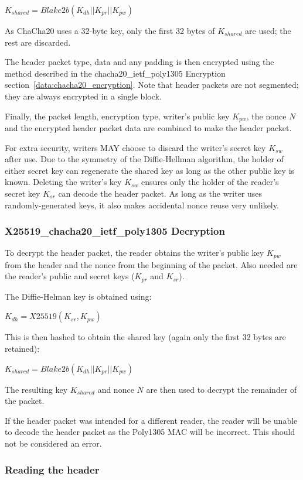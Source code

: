\documentclass[10pt]{article}
\begin{document}
$K_{shared} = Blake2b(K_{dh} || K_{pr} || K_{pw})$

As ChaCha20 uses a 32-byte key, only the first 32 bytes of $K_{shared}$ are used; the rest are discarded.

The header packet type, data and any padding is then encrypted using the method described in the
chacha20\_ietf\_poly1305 Encryption section~\ref{data:chacha20_encryption}.
Note that header packets are not segmented; they are always encrypted in a single block.

Finally, the packet length, encryption type, writer's public key $K_{pw}$,
the nonce $N$ and the encrypted header packet data are combined to make the header packet.

For extra security, writers MAY choose to discard the writer's secret key $K_{sw}$ after use.
Due to the symmetry of the Diffie-Hellman algorithm, the holder of either secret key can regenerate the shared
key as long as the other public key is known.
Deleting the writer's key $K_{sw}$ ensures only the holder of the reader's secret key $K_{sr}$ can decode the header
packet.
As long as the writer uses randomly-generated keys, it also makes accidental nonce reuse very unlikely.

\subsubsection{X25519\_chacha20\_ietf\_poly1305 Decryption}

To decrypt the header packet, the reader obtains the writer's public key $K_{pw}$ from the header
and the nonce from the beginning of the packet.
Also needed are the reader's public and secret keys ($K_{pr}$ and $K_{sr}$).

The Diffie-Helman key is obtained using:

$K_{dh} = X25519(K_{sr}, K_{pw})$

This is then hashed to obtain the shared key (again only the first 32 bytes are retained):

$K_{shared} = Blake2b(K_{dh} || K_{pr} || K_{pw})$

The resulting key $K_{shared}$ and nonce $N$ are then used to decrypt the remainder of the packet.

If the header packet was intended for a different reader, the reader will be unable to decode the header packet
as the Poly1305 MAC will be incorrect.
This should not be considered an error.

\subsubsection{Reading the header}
\end{document}
